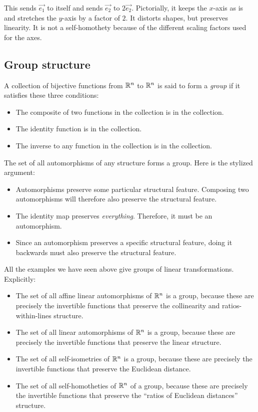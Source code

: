 \documentclass[10pt]{amsart}
\begin{document}
This sends $\vec{e_1}$ to itself and sends $\vec{e_2}$ to
$2\vec{e_2}$. Pictorially, it keeps the $x$-axis as is and stretches
the $y$-axis by a factor of $2$. It distorts shapes, but preserves
linearity. It is not a self-homothety because of the different scaling
factors used for the axes.
\subsection{Group structure}

A collection of bijective functions from $\mathbb{R}^n$ to $\mathbb{R}^n$ is said to
form a {\em group} if it satisfies these three conditions:

\begin{itemize}
\item The composite of two functions in the collection is in the collection.
\item The identity function is in the collection.
\item The inverse to any function in the collection is in the collection.
\end{itemize}

The set of all automorphisms of any structure forms a group. Here is
the stylized argument:

\begin{itemize}
\item Automorphisms preserve some particular structural
  feature. Composing two automorphisms will therefore also preserve
  the structural feature.
\item The identity map preserves {\em everything}. Therefore, it must
  be an automorphism.
\item Since an automorphism preserves a specific structural feature,
  doing it backwards must also preserve the structural feature.
\end{itemize}

All the examples we have seen above give groups of linear
transformations. Explicitly:

\begin{itemize}
\item The set of all affine linear automorphisms of $\mathbb{R}^n$ is a group,
  because these are precisely the invertible functions that preserve
  the collinearity and ratios-within-lines structure.
\item The set of all linear automorphisms of $\mathbb{R}^n$ is a group,
  because these are precisely the invertible functions that preserve
  the linear structure.
\item The set of all self-isometries of $\mathbb{R}^n$ is a group, because
  these are precisely the invertible functions that preserve the
  Euclidean distance.
\item The set of all self-homotheties of $\mathbb{R}^n$ of a group, because
  these are precisely the invertible functions that preserve the
  ``ratios of Euclidean distances'' structure.
\end{itemize}
\end{document}
